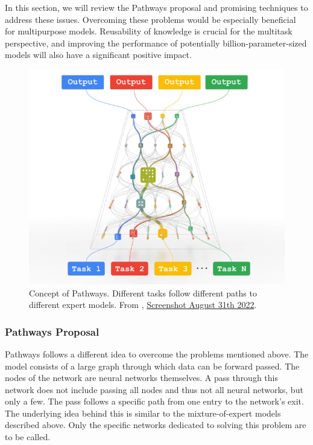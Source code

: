 \documentclass[
]{krantz}
\begin{document}
In this section, we will review the Pathways proposal \citep{Dean21} and promising techniques to address these issues. Overcoming these problems would be especially beneficial for multipurpose
models. Reusability of knowledge is crucial for the multitask perspective, and improving the performance of potentially billion-parameter-sized models will also have a significant positive impact.

\begin{figure}

{\centering \includegraphics[width=0.8\linewidth]{figures/03-03-multipurpose/Pathways} 

}

\caption{Concept of Pathways. Different tasks follow different paths to different expert models. From \citet{Dean21}, \href{https://www.youtube.com/watch?v=Nf-d9CcEZ2w}{Screenshot August 31th 2022}.}\label{fig:pathways}
\end{figure}



\hypertarget{pathways-proposal}{%
\subsubsection{Pathways Proposal}\label{pathways-proposal}}

Pathways \citep{Dean21} follows a different idea to overcome the problems mentioned above. The model consists of a large graph through which data can be forward passed. The nodes of the network are neural
networks themselves. A pass through this network does not include passing all nodes and thus not all neural networks, but only a few. The pass follows a specific path from one entry to the
network's exit. The underlying idea behind this is similar to the mixture-of-expert models described above. Only the specific networks dedicated to solving this problem are to be called.
\end{document}
